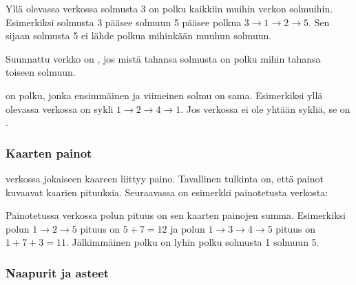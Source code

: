 Yllä olevassa verkossa solmusta 3 on polku
kaikkiin muihin verkon solmuihin.
Esimerkiksi solmusta 3 pääsee solmuun 5 pääsee polkua
$3 \rightarrow 1 \rightarrow 2 \rightarrow 5$.
Sen sijaan solmusta 5 ei lähde polkua mihinkään muuhun
solmuun.


Suunnattu verkko on ,
jos mistä tahansa solmusta on polku mihin
tahansa toiseen solmuun.


 on polku, jonka ensimmäinen
ja viimeinen solmu on sama.
Esimerkiksi yllä olevassa verkossa on sykli
$1 \rightarrow 2 \rightarrow 4 \rightarrow 1$.
Jos verkossa ei ole yhtään sykliä, se on .

\subsubsection{Kaarten painot}


 verkossa
jokaiseen kaareen liittyy paino.
Tavallinen tulkinta on, että painot kuvaavat
kaarien pituuksia.
Seuraavassa on esimerkki painotetusta verkosta:
\begin{center}
\end{center}

Painotetussa verkossa polun pituus on sen kaarten painojen summa.
Esimerkiksi polun $1 \rightarrow 2 \rightarrow 5$
pituus on $5+7=12$ ja polun
$1 \rightarrow 3 \rightarrow 4 \rightarrow 5$ pituus on $1+7+3=11$.
Jälkimmäinen polku on lyhin polku solmusta 1 solmuun 5.

\subsubsection{Naapurit ja asteet}

